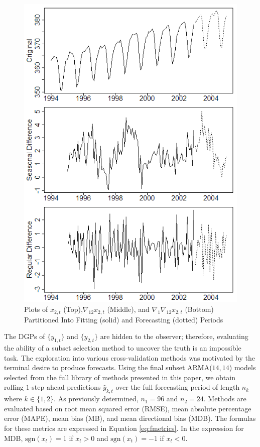 \begin{figure}[htbp!]
	\centering
	\caption{Plots of $x_{2,t}$ (Top),$\nabla_{12}x_{2,t}$ (Middle), and $\nabla_1\nabla_{12}x_{2,t}$ (Bottom) Partitioned Into Fitting (solid) and Forecasting (dotted) Periods}
	\label{fig:co2plots2}
	\includegraphics[scale=0.8]{co2plots2}
\end{figure}


The DGPs of $\{y_{1,t}\}$ and $\{y_{2,t}\}$ are hidden to the observer; therefore, evaluating the ability of a subset selection method to uncover the truth is an impossible task. The exploration into various cross-validation methods was motivated by the terminal desire to produce forecasts. Using the final subset ARMA($14,14$) models selected from the full library of methods presented in this paper, we obtain rolling $1$-step ahead predictions $\hat{y}_{k,t}$ over the full forecasting period of length $n_k$ where $k\in\{1,2\}$. As previously determined, $n_1=96$ and $n_2=24$.  Methods are evaluated based on root mean squared error (RMSE), mean absolute percentage error (MAPE), mean bias (MB), and mean directional bias (MDB). The formulas for these metrics are expressed in Equation \ref{eq:fmetrics}. In the expression for MDB, $\textrm{sgn}(x_t)=1$ if $x_t>0$ and $\textrm{sgn}(x_t)=-1$ if $x_t<0$.


